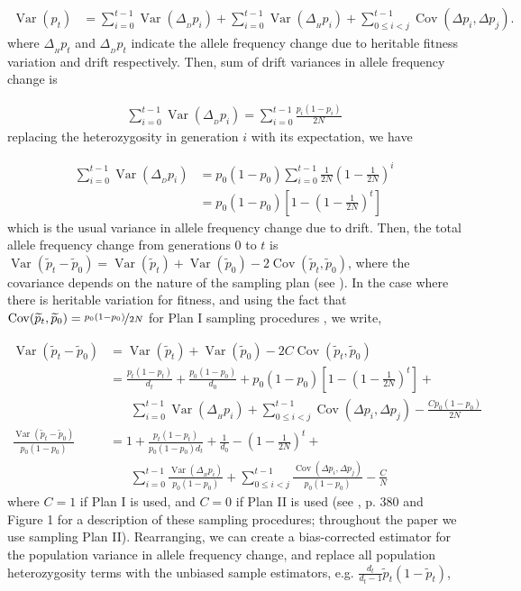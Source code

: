 \documentclass[11pt]{article}
\DeclareMathOperator{\var}{Var}
\DeclareMathOperator{\cov}{Cov}
\begin{document}
\begin{align}
  \var(p_t) &= \sum_{i=0}^{t-1} \var(\Delta_{_D} p_i) + \sum_{i=0}^{t-1} \var(\Delta_{_H} p_i) + \sum_{0 \le i < j}^{t-1} \cov(\Delta p_i, \Delta p_j).
\end{align}
%
where $\Delta_{_H} p_t$ and $\Delta_{_D} p_t$ indicate the allele frequency
change due to heritable fitness variation and drift respectively. Then, sum of
drift variances in allele frequency change is

\begin{align}
  \sum_{i=0}^{t-1} \var(\Delta_{_D} p_i) = \sum_{i=0}^{t-1} \frac{p_i(1-p_i)}{2N}
\end{align}
%
replacing the heterozygosity in generation $i$ with its expectation, we have

\begin{align}
  \sum_{i=0}^{t-1} \var(\Delta_{_D} p_i) &= p_0(1-p_0) \sum_{i=0}^{t-1} \frac{1}{2N} \left(1-\frac{1}{2N}\right)^i \\
                                         &= p_0(1-p_0) \left[1 - \left(1-\frac{1}{2N}\right)^t \right]
\end{align}
%
which is the usual variance in allele frequency change due to drift.  Then, the
total allele frequency change from generations $0$ to $t$ is
$\var(\widetilde{p}_t - \widetilde{p}_0) = \var(\widetilde{p}_t) +
\var(\widetilde{p}_0) - 2 \cov(\widetilde{p}_t, \widetilde{p}_0)$, where the
covariance depends on the nature of the sampling plan (see \cite{Nei1981-oy,
Waples1989-sj}). In the case where there is heritable variation for fitness,
and using the fact that $\cov(\widetilde{p}_t, \widetilde{p}_0) =
\nicefrac{p_0(1-p_0)}{2N}$ for Plan I sampling procedures
\parencite{Waples1989-sj}, we write,

\begin{align}
  \var(\widetilde{p}_t - \widetilde{p}_0) &= \var(\widetilde{p}_t) + \var(\widetilde{p}_0) - 2 C \cov(\widetilde{p}_t, \widetilde{p}_0) \\
                                          &= \frac{p_t(1-p_t)}{d_t}  + \frac{p_0(1-p_0)}{d_0} + p_0(1-p_0) \left[1 - \left(1-\frac{1}{2N}\right)^t \right] + \\ & \;\;\;\;\;\;
                                               \sum_{i=0}^{t-1} \var(\Delta_{_H} p_i)  + \sum_{0 \le i < j}^{t-1} \cov(\Delta p_i, \Delta p_j) - \frac{C p_0(1-p_0)}{2N} \\
  \frac{\var(\widetilde{p}_t - \widetilde{p}_0)}{p_0(1-p_0)} &= 1 + \frac{p_t(1-p_t)}{p_0(1-p_0)d_t}  + \frac{1}{d_0} - \left(1-\frac{1}{2N}\right)^t + \\ & \;\;\;\;\;\;
  \sum_{i=0}^{t-1} \frac{\var(\Delta_{_H} p_i)}{p_0(1-p_0)}  + \sum_{0 \le i < j}^{t-1} \frac{\cov(\Delta p_i, \Delta p_j)}{p_0(1-p_0)} - \frac{C}{N}
\end{align}
%
where $C = 1$ if Plan I is used, and $C=0$ if Plan II is used (see
\cite{Waples1989-sj}, p. 380 and Figure 1 for a description of these sampling
procedures; throughout the paper we use sampling Plan II). Rearranging, we can
create a bias-corrected estimator for the population variance in allele
frequency change, and replace all population heterozygosity terms with the
unbiased sample estimators, e.g. $\frac{d_t}{d_t-1} \widetilde{p}_t (1-
\widetilde{p}_t)$,
\end{document}
